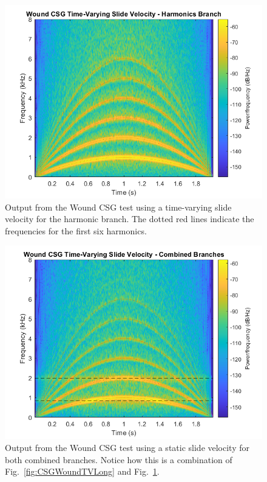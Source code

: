 \documentclass[../main.tex]{subfiles}
\begin{document}
\begin{figure}[t]
    \centering
    \includegraphics[scale=.60]{./images/plots/CSG_Wound_TV_Harm.png}
    \caption{Output from the Wound CSG test using a time-varying slide velocity for the harmonic branch. The dotted red lines indicate the frequencies for the first six harmonics.}
    \label{fig:CSGWoundTVHarm}
\end{figure}

\begin{figure}[b]
    \centering
    \includegraphics[scale=.60]{./images/plots/CSG_Wound_TV_Both.png}
    \caption{Output from the Wound CSG test using a static slide velocity for both combined branches. Notice how this is a combination of Fig.~\ref{fig:CSGWoundTVLong} and Fig.~\ref{fig:CSGWoundTVHarm}.}
    \label{fig:CSGWoundTVBoth}
\end{figure}
\end{document}
